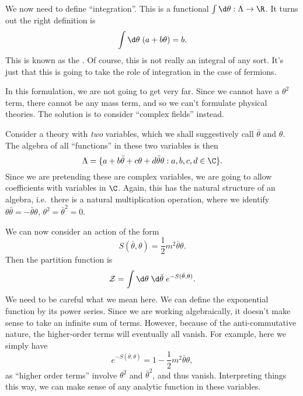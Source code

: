 \documentclass[a4paper]{article}
\begin{document}
We now need to define ``integration''. This is a functional $\int \d \theta: \Lambda \to \R$. It turns out the right definition is
\[
  \int \d \theta\; (a + b \theta) = b.
\]
This is known as the . Of course, this is not really an integral of any sort. It's just that this is going to take the role of integration in the case of fermions.

In this formulation, we are not going to get very far. Since we cannot have a $\theta^2$ term, there cannot be any mass term, and so we can't formulate physical theories. The solution is to consider ``complex fields'' instead.

Consider a theory with \emph{two} variables, which we shall suggestively call $\bar{\theta}$ and $\theta$. The algebra of all ``functions'' in these two variables is then
\[
  \Lambda = \{a + b \bar{\theta} + c \theta + d \bar{\theta} \theta: a, b, c, d \in \C\}.
\]
Since we are pretending these are complex variables, we are going to allow coefficients with variables in $\C$. Again, this has the natural structure of an algebra, i.e.\ there is a natural multiplication operation, where we identify $\theta \bar{\theta} = -\bar{\theta} \theta$, $\theta^2 = \bar{\theta}^2 = 0$.

We can now consider an action of the form
\[
  S(\bar{\theta}, \theta) = \frac{1}{2} m^2 \bar{\theta} \theta.
\]
Then the partition function is
\[
  \mathcal{Z} = \int \d \theta\; \d \bar{\theta}\; e^{-S(\bar{\theta}, \theta)}.
\]
We need to be careful what we mean here. We can define the exponential function by its power series. Since we are working algebraically, it doesn't make sense to take an infinite sum of terms. However, because of the anti-commutative nature, the higher-order terms will eventually all vanish. For example, here we simply have
\[
  e^{-S(\bar{\theta}, \theta)} = 1 - \frac{1}{2} m^2 \bar{\theta}\theta,
\]
as ``higher order terms'' involve $\theta^2$ and $\bar{\theta}^2$, and thus vanish. Interpreting things this way, we can make sense of any analytic function in these variables.
\end{document}
